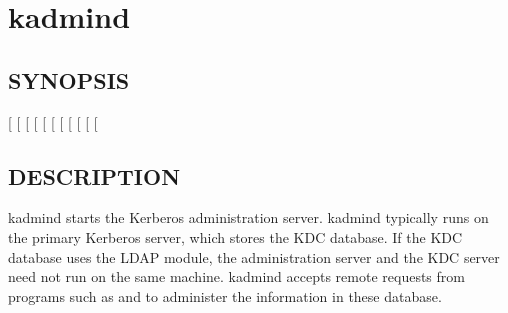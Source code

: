 \documentclass[letterpaper,10pt,english]{sphinxmanual}
\begin{document}
\sphinxstepscope


\section{kadmind}
\label{\detokenize{admin/admin_commands/kadmind:kadmind}}\label{\detokenize{admin/admin_commands/kadmind:kadmind-8}}\label{\detokenize{admin/admin_commands/kadmind::doc}}

\subsection{SYNOPSIS}
\label{\detokenize{admin/admin_commands/kadmind:synopsis}}
\sphinxAtStartPar
{}
{[} \sphinxstyleemphasis{db\_args}{]}
{[} \sphinxstyleemphasis{realm}{]}
{[}\sphinxstylestrong{\sphinxhyphen{}m}{]}
{[}\sphinxstylestrong{\sphinxhyphen{}nofork}{]}
{[}\sphinxstylestrong{\sphinxhyphen{}proponly}{]}
{[} \sphinxstyleemphasis{port\sphinxhyphen{}number}{]}
{[} \sphinxstyleemphasis{pid\_file}{]}
{[} \sphinxstyleemphasis{kdb5\_util\_path}{]}
{[} \sphinxstyleemphasis{kprop\_path}{]}
{[} \sphinxstyleemphasis{kprop\_port}{]}
{[} \sphinxstyleemphasis{dump\_file}{]}


\subsection{DESCRIPTION}
\label{\detokenize{admin/admin_commands/kadmind:description}}
\sphinxAtStartPar
kadmind starts the Kerberos administration server.  kadmind typically
runs on the primary Kerberos server, which stores the KDC database.
If the KDC database uses the LDAP module, the administration server
and the KDC server need not run on the same machine.  kadmind accepts
remote requests from programs such as {\hyperref[\detokenize{admin/admin_commands/kadmin_local:kadmin-1}]{}} and
 to administer the information in these database.
\end{document}
